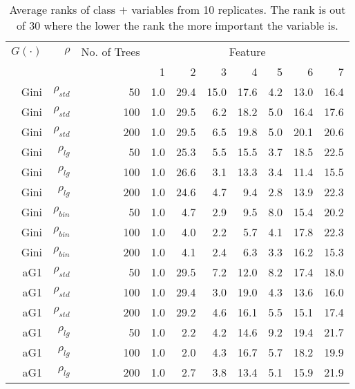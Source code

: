 \documentclass[twoside,11pt]{article}
\begin{document}
\begin{table}%
  \centering
  \caption{Average ranks of class $+$ variables from 10 replicates. The rank is out of 30 where the lower the rank the more important the variable is.}

\begin{tabular}{rrrrrrrrrr}
\hline
$G(\cdot)$ & $\rho$ & No. of Trees & \multicolumn{7}{c}{Feature}\\
 &  &  &  1 &  2 &  3 &  4 &  5 &  6 &  7 \bigstrut\\
\hline
Gini     & $\rho_{std}$ & 50    & 1.0   & 29.4  & 15.0  & 17.6  & 4.2   & 13.0  & 16.4 \bigstrut[t]\\
Gini     & $\rho_{std}$ & 100   & 1.0   & 29.5  & 6.2   & 18.2  & 5.0   & 16.4  & 17.6 \\
Gini     & $\rho_{std}$ & 200   & 1.0   & 29.5  & 6.5   & 19.8  & 5.0   & 20.1  & 20.6 \bigstrut[b]\\
\hline
Gini     & $\rho_{lg}$ & 50    & 1.0   & 25.3  & 5.5   & 15.5  & 3.7   & 18.5  & 22.5 \bigstrut[t]\\
Gini     & $\rho_{lg}$ & 100   & 1.0   & 26.6  & 3.1   & 13.3  & 3.4   & 11.4  & 15.5 \\
Gini     & $\rho_{lg}$ & 200   & 1.0   & 24.6  & 4.7   & 9.4   & 2.8   & 13.9  & 22.3 \bigstrut[b]\\
\hline
Gini     & $\rho_{bin}$ & 50    & 1.0   & 4.7   & 2.9   & 9.5   & 8.0   & 15.4  & 20.2 \bigstrut[t]\\
Gini     & $\rho_{bin}$ & 100   & 1.0   & 4.0   & 2.2   & 5.7   & 4.1   & 17.8  & 22.3 \\
Gini     & $\rho_{bin}$ & 200   & 1.0   & 4.1   & 2.4   & 6.3   & 3.3   & 16.2  & 15.3 \bigstrut[b]\\
\hline
aG1   & $\rho_{std}$ & 50    & 1.0   & 29.5  & 7.2   & 12.0  & 8.2   & 17.4  & 18.0 \bigstrut[t]\\
aG1   & $\rho_{std}$ & 100   & 1.0   & 29.4  & 3.0   & 19.0  & 4.3   & 13.6  & 16.0 \\
aG1   & $\rho_{std}$ & 200   & 1.0   & 29.2  & 4.6   & 16.1  & 5.5   & 15.1  & 17.4 \bigstrut[b]\\
\hline
aG1   & $\rho_{lg}$ & 50    & 1.0   & 2.2   & 4.2   & 14.6  & 9.2   & 19.4  & 21.7 \bigstrut[t]\\
aG1   & $\rho_{lg}$ & 100   & 1.0   & 2.0   & 4.3   & 16.7  & 5.7   & 18.2  & 19.9 \\
aG1   & $\rho_{lg}$ & 200   & 1.0   & 2.7   & 3.8   & 13.4  & 5.1   & 15.9  & 21.9 \bigstrut[b]\\

\end{tabular}
\end{table}
\end{document}
